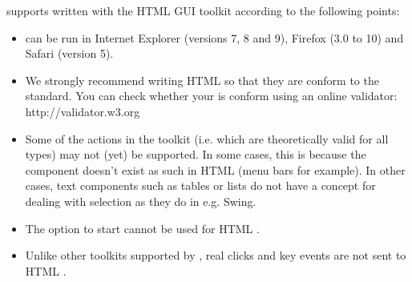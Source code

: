 \app{} supports \gdauts{} written with the HTML GUI toolkit according to the following points:

\begin{itemize}
\item \gdauts{} can be run in Internet Explorer (versions 7, 8 and 9), Firefox (3.0 to 10) and Safari (version 5). 
\item We strongly recommend writing HTML \gdauts{} so that they are conform to the  standard. You can check whether your \gdaut{} is  conform using an online validator: http://validator.w3.org
\item Some of the \app{} actions in the  toolkit (i.e. which are theoretically valid for all \gdaut{} types) may not (yet) be supported. In some cases, this is because the component doesn't exist as such in HTML \gdauts{} (menu bars for example). In other cases, text components such as tables or lists do not have a concept for dealing with selection as they do in e.g. Swing. 
\item The  option to start \gdauts{}  cannot be used for HTML \gdauts{}. 
\item Unlike other toolkits supported by \app{}, real clicks and key events are not sent to HTML \gdauts{}.
\end{itemize}
